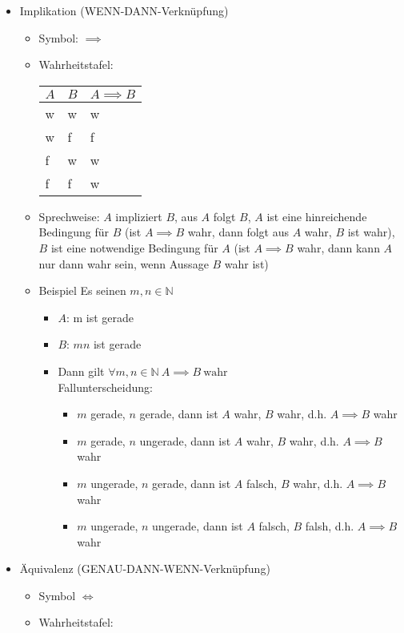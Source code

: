 \documentclass[a4paper]{scrartcl}
\DeclareMathOperator{\Forall}{\forall}
\theoremstyle{definition}
\theoremstyle{plain}
\theoremstyle{plain}
\theoremstyle{remark}
\theoremstyle{remark}
\theoremstyle{remark}
\theoremstyle{remark}
\theoremstyle{remark}
\begin{document}
\begin{itemize}
\item Implikation (WENN-DANN-Verknüpfung)
\begin{itemize}
\item Symbol: $\implies$
\item Wahrheitstafel:
\begin{center}
\begin{tabular}{lll}
$A$ & $B$ & $A\implies B$\\
\hline
w & w & w\\
w & f & f\\
f & w & w\\
f & f & w\\
\end{tabular}
\end{center}
\item Sprechweise: $A$ impliziert $B$, aus $A$ folgt $B$, $A$ ist eine hinreichende Bedingung für $B$ (ist $A\implies B$ wahr, dann folgt aus $A$ wahr, $B$ ist wahr), $B$ ist eine notwendige Bedingung für $A$ (ist $A\implies B$ wahr, dann kann $A$ nur dann wahr sein, wenn Aussage $B$ wahr ist)
\item Beispiel Es seinen $m,n\in\mathbb{N}$
\begin{itemize}
\item $A$: m ist gerade
\item $B$: $mn$ ist gerade
\item Dann gilt $\Forall m,n \in\mathbb{N}~A\implies B~\text{wahr}$ \\
         Fallunterscheidung:
\begin{itemize}
\item $m$ gerade, $n$ gerade, dann ist $A$ wahr, $B$ wahr, d.h. $A\implies B$ wahr
\item $m$ gerade, $n$ ungerade, dann ist $A$ wahr, $B$ wahr, d.h. $A\implies B$ wahr
\item $m$ ungerade, $n$ gerade, dann ist $A$ falsch, $B$ wahr, d.h. $A\implies B$ wahr
\item $m$ ungerade, $n$ ungerade, dann ist $A$ falsch, $B$ falsh, d.h. $A\implies B$ wahr
\end{itemize}
\end{itemize}
\end{itemize}
\item Äquivalenz (GENAU-DANN-WENN-Verknüpfung)
\begin{itemize}
\item Symbol $\iff$
\item Wahrheitstafel:
\begin{center}

\end{center}
\end{itemize}
\end{itemize}
\end{document}
